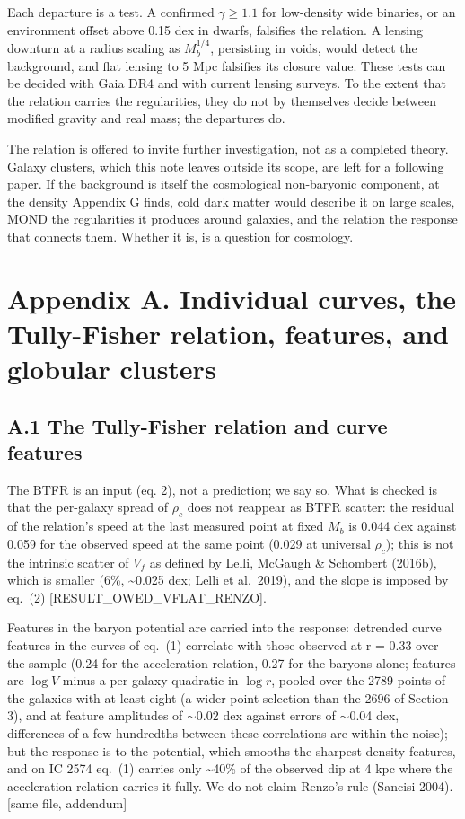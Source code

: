 \documentclass[
  10pt,
]{article}
\begin{document}
Each departure is a test. A confirmed $\gamma\ge1.1$ for low-density wide binaries, or an environment offset above 0.15 dex in dwarfs, falsifies the relation. A lensing downturn at a radius scaling as $M_b^{1/4}$, persisting in voids, would detect the background, and flat lensing to 5 Mpc falsifies its closure value. These tests can be decided with Gaia DR4 and with current lensing surveys. To the extent that the relation carries the regularities, they do not by themselves decide between modified gravity and real mass; the departures do.

The relation is offered to invite further investigation, not as a completed theory. Galaxy clusters, which this note leaves outside its scope, are left for a following paper. If the background is itself the cosmological non-baryonic component, at the density Appendix G finds, cold dark matter would describe it on large scales, MOND the regularities it produces around galaxies, and the relation the response that connects them. Whether it is, is a question for cosmology.

\section{Appendix A. Individual curves, the Tully-Fisher relation, features, and globular clusters}\label{appendix-a.-individual-curves-the-tully-fisher-relation-features-and-globular-clusters}

\subsection{A.1 The Tully-Fisher relation and curve features}\label{the-tully-fisher-relation-and-curve-features}

The BTFR is an input (eq. 2), not a prediction; we say so. What is checked is that the per-galaxy spread of $\rho_c$ does not reappear as BTFR scatter: the residual of the relation's speed at the last measured point at fixed $M_b$ is 0.044 dex against 0.059 for the observed speed at the same point (0.029 at universal $\rho_c$); this is not the intrinsic scatter of $V_f$ as defined by Lelli, McGaugh \& Schombert (2016b), which is smaller (6\%, \textasciitilde{}0.025 dex; Lelli et al.~2019), and the slope is imposed by eq.~(2) {[}RESULT\_OWED\_VFLAT\_RENZO{]}.

Features in the baryon potential are carried into the response: detrended curve features in the curves of eq.~(1) correlate with those observed at r = 0.33 over the sample (0.24 for the acceleration relation, 0.27 for the baryons alone; features are $\log V$ minus a per-galaxy quadratic in $\log r$, pooled over the 2789 points of the galaxies with at least eight (a wider point selection than the 2696 of Section 3), and at feature amplitudes of $\sim$0.02 dex against errors of $\sim$0.04 dex, differences of a few hundredths between these correlations are within the noise); but the response is to the potential, which smooths the sharpest density features, and on IC 2574 eq.~(1) carries only \textasciitilde{}40\% of the observed dip at 4 kpc where the acceleration relation carries it fully. We do not claim Renzo's rule (Sancisi 2004). {[}same file, addendum{]}
\end{document}
